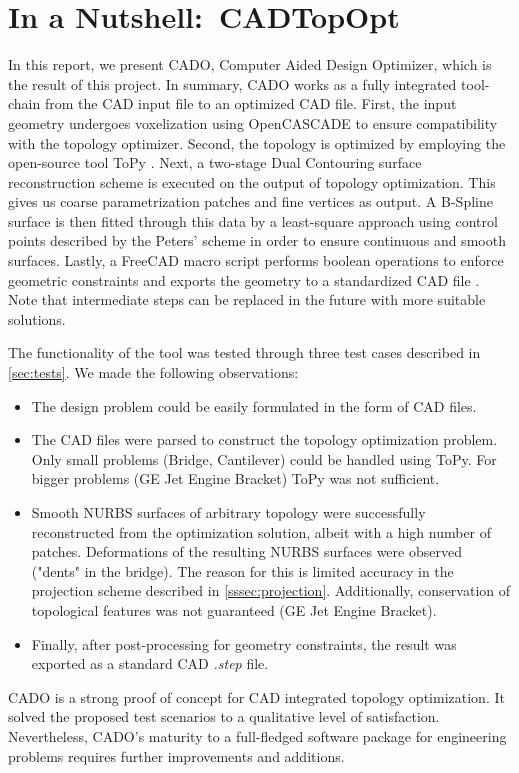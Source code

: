 \section{In a Nutshell:\ \acl{CADTopOpt}}
\label{sec:nutshell}
In this report, we present CADO, Computer Aided Design Optimizer, which is the result of this project. In summary, CADO works as a fully integrated tool-chain from the CAD input file to an optimized CAD file. First, the input geometry undergoes voxelization using OpenCASCADE to ensure compatibility with the topology optimizer. Second, the topology is optimized by employing the open-source tool ToPy \cite{ToPy}.  
Next, a two-stage Dual Contouring surface reconstruction scheme is executed on the output of topology optimization. This gives us coarse parametrization patches and fine vertices as output.
A B-Spline surface is then fitted through this data by a least-square approach using control points described by the Peters' scheme \cite{peters1992constructing} in order to ensure continuous and smooth surfaces. Lastly, a FreeCAD macro script performs boolean operations to enforce geometric constraints and exports the geometry to a standardized CAD file \cite{FreeCAD}.
Note that intermediate steps can be replaced in the future with more suitable solutions. 

The functionality of the tool was tested through three test cases described in \autoref{sec:tests}. We made the following observations:
\begin{itemize}
\item The design problem could be easily formulated in the form of CAD files.
\item The CAD files were parsed to construct the topology optimization problem. Only small problems (Bridge, Cantilever) could be handled using ToPy. For bigger problems (GE Jet Engine Bracket) ToPy was not sufficient.
\item Smooth NURBS surfaces of arbitrary topology were successfully reconstructed from the optimization solution, albeit with a high number of patches. Deformations of the resulting NURBS surfaces were observed ("dents" in the bridge). The reason for this is limited accuracy in the projection scheme described in \autoref{sssec:projection}. Additionally, conservation of topological features was not guaranteed (GE Jet Engine Bracket).
\item Finally, after post-processing for geometry constraints, the result was exported as a standard CAD \emph{.step} file.
\end{itemize}
CADO is a strong proof of concept for CAD integrated topology optimization. It solved the proposed test scenarios to a qualitative level of satisfaction. Nevertheless, CADO's maturity to a full-fledged software package for engineering problems requires further improvements and additions.